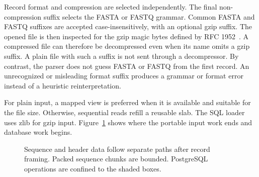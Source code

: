 Record format and compression are selected independently. The final
non-compression suffix selects the FASTA or FASTQ grammar. Common FASTA and
FASTQ suffixes are accepted case-insensitively, with an optional gzip suffix.
The opened file is then inspected for the gzip magic bytes defined by RFC
1952~\cite{rfc1952_gzip}. A compressed file can therefore be decompressed even
when its name omits a gzip suffix. A plain file with such a suffix is not sent
through a decompressor. By contrast, the parser does not guess FASTA or FASTQ
from the first record. An unrecognized or misleading format suffix produces a
grammar or format error instead of a heuristic reinterpretation.

For plain input, a mapped view is preferred when it is available and suitable
for the file size. Otherwise, sequential reads refill a reusable slab. The SQL
loader uses zlib for gzip input. Figure~\ref{fig:io-load-pipeline} shows where the
portable input work ends and database work begins.

\begin{figure}[htbp]
\centering
{}
\caption{Sequence and header data follow separate paths after record framing.
Packed sequence chunks are bounded. PostgreSQL operations are confined to the
shaded boxes.}
\label{fig:io-load-pipeline}
\end{figure}

